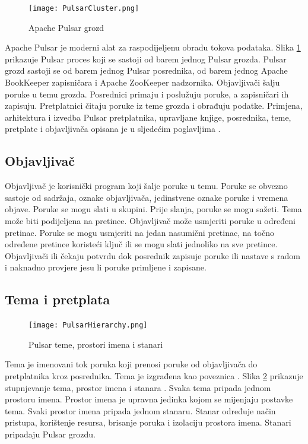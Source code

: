 \documentclass[utf8, diplomski, lmodern, numeric]{fer}
\begin{document}
\begin{figure}[H]
    \centering
    \texttt{[image: PulsarCluster.png]}
    \caption{Apache Pulsar grozd}
    \label{fig:pulsar-cluster}
\end{figure}

Apache Pulsar je moderni alat za raspodijeljenu obradu tokova podataka. Slika \ref{fig:pulsar-cluster} prikazuje Pulsar proces koji se sastoji od barem jednog Pulsar grozda. Pulsar grozd sastoji se od barem jednog Pulsar posrednika, od barem jednog Apache BookKeeper zapisničara i Apache ZooKeeper nadzornika. Objavljivači šalju poruke u temu grozda. Posrednici primaju i poslužuju poruke, a zapisničari ih zapisuju. Pretplatnici čitaju poruke iz teme grozda i obrađuju podatke. Primjena, arhitektura i izvedba Pulsar pretplatnika, upravljane knjige, posrednika, teme, pretplate i objavljivača opisana je u sljedećim poglavljima \citep{pulsar-docs} \citep{pulsar-streamlio-1} \citep{pulsar-streamlio-2} \citep{pulsar-streamlio-intro}.

\subsection{Objavljivač}
Objavljivač je korisnički program koji šalje poruke u temu. Poruke se obvezno sastoje od sadržaja, oznake objavljivača, jedinstvene oznake poruke i vremena objave. Poruke se mogu slati u skupini. Prije slanja, poruke se mogu sažeti. Tema može biti podijeljena na pretince. Objavljivač može usmjeriti poruke u određeni pretinac. Poruke se mogu usmjeriti na jedan nasumični pretinac, na točno određene pretince koristeći ključ ili se mogu slati jednoliko na sve pretince. Objavljivači ili čekaju potvrdu dok posrednik zapisuje poruke ili nastave s radom i naknadno provjere jesu li poruke primljene i zapisane.

\subsection{Tema i pretplata}

\begin{figure}[H]
    \centering
    \texttt{[image: PulsarHierarchy.png]}
    \caption{Pulsar teme, prostori imena i stanari}
    \label{fig:pulsar-hierarchy}
\end{figure}

Tema je imenovani tok poruka koji prenosi poruke od objavljivača do pretplatnika kroz posrednika. Tema je izgrađena kao poveznica . Slika \ref{fig:pulsar-hierarchy} prikazuje stupnjevanje tema, prostor imena  i stanara . Svaka tema pripada jednom prostoru imena. Prostor imena je upravna jedinka kojom se mijenjaju postavke tema. Svaki prostor imena pripada jednom stanaru. Stanar određuje način pristupa, korištenje resursa, brisanje poruka i izolaciju prostora imena. Stanari pripadaju Pulsar grozdu.
\end{document}
